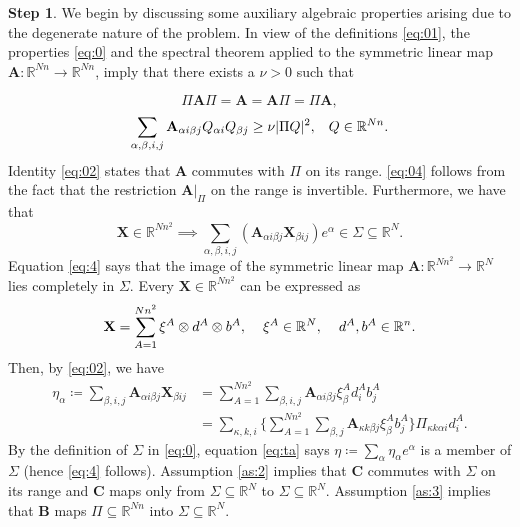 \documentclass{amsart}
\numberwithin{equation}{section}
\numberwithin{thm}{section}
\theoremstyle{definition}
\newtheorem{proofpart}{Step}
\renewcommand{\:}{\!:\!} %
\renewcommand{\^}[1]{^{#1}_{\phantom{l}}}
\begin{document}
\begin{proofpart}
We begin by discussing some auxiliary algebraic properties arising due to the degenerate nature of the problem. In view of the definitions \eqref{eq:01}, the properties \eqref{eq:0} and the spectral theorem applied to the symmetric linear map $\mathbf{A} : \mathbb{R}^{Nn} \longrightarrow \mathbb{R}^{Nn}$, imply that there exists a $\nu > 0$ such that

\begin{equation} \label{eq:02}
\Pi \mathbf{A} \Pi = \mathbf{A} =  \mathbf{A} \Pi = \Pi \mathbf{A},
\end{equation}
\begin{equation}  \label{eq:04}
\sum_{\alpha, \beta, i, j} \mathbf{A}_{\alpha i \beta j} Q_{\alpha i} Q_{\beta j} \geq \nu \lvert \Pi Q \rvert^2, \hspace{0.3cm} Q \in \mathbb{R}^{Nn}.
\end{equation}
Identity \eqref{eq:02} states that $\mathbf{A}$ commutes with $\Pi$ on its range. \eqref{eq:04} follows from the fact that the restriction $\mathbf{A} \rvert_{\Pi}$ on the range is invertible. Furthermore, we have that
\begin{equation} \label{eq:4}
\mathbf{X} \in \mathbb{R}^{Nn^2}  \implies \sum_{\alpha, \beta, i, j} (\mathbf{A}_{\alpha i \beta j}\mathbf{X}_{\beta i j})e^{\alpha} \in \Sigma \subseteq \mathbb{R}^{N}.
\end{equation}
Equation \eqref{eq:4} says that the image of the symmetric linear map $\mathbf{A} : \mathbb{R}^{Nn^2} \longrightarrow \mathbb{R}^{N}$ lies completely in $\Sigma$. Every $\mathbf{X} \in \mathbb{R}^{Nn^2}$ can be expressed as
\[
\mathbf{X} = \sum_{A = 1}^{Nn^2} \xi^A \otimes d^A \otimes b^A, \hspace{0.4cm} \xi^A \in \mathbb{R}^N, \hspace{0.4cm}d^A, b^A \in \mathbb{R}^n.
\]
Then, by \eqref{eq:02}, we have 
\begin{equation} \label{eq:ta}
\begin{split}
\eta_{\alpha} \coloneqq \sum_{\beta, i, j} \mathbf{A}_{\alpha i \beta j} \mathbf{X}_{\beta i j} &= \sum_{A = 1}^{Nn^2} \sum_{\beta, i, j} \mathbf{A}_{\alpha i \beta j} \xi^{A}_{\beta}d^{A}_{i}b^{A}_{j} \\&= \sum_{\kappa, k, i}\biggl\{\sum_{A = 1}^{Nn^2} \sum_{\beta, j} \mathbf{A}_{\kappa k \beta j} \xi^{A}_{\beta}b^{A}_{j}\biggl\} \Pi_{\kappa k \alpha i} d^{A}_{i}. \nonumber
\end{split}
\end{equation}
By the definition of $\Sigma$ in \eqref{eq:0}, equation \eqref{eq:ta} says $\eta \coloneqq \sum_{\alpha} \eta_{\alpha}e^{\alpha}$ is a member of $\Sigma$ (hence \eqref{eq:4} follows). Assumption \eqref{as:2} implies that $\mathbf{C}$ commutes with $\Sigma$ on its range and $\mathbf{C}$ maps only from $\Sigma \subseteq \mathbb{R}^N$ to $\Sigma \subseteq \mathbb{R}^N$. Assumption \eqref{as:3} implies that $\mathbf{B}$ maps $\Pi \subseteq \mathbb{R}^{Nn}$ into $\Sigma \subseteq \mathbb{R}^N$.
\end{proofpart}
\end{document}
